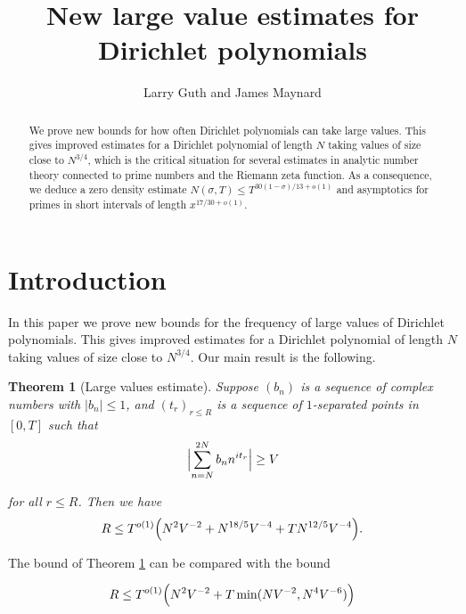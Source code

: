 \documentclass{amsart}
\title{New large value estimates for Dirichlet polynomials}
\author{Larry Guth and James Maynard}
\theoremstyle{plain}
\newtheorem{thrm}{Theorem}[section]
\numberwithin{equation}{section}
\begin{document}
\begin{abstract}
We prove new bounds for how often Dirichlet polynomials can take large values. This gives improved estimates for a Dirichlet polynomial of length $N$ taking values of size close to $N^{3/4}$, which is the critical situation for several estimates in analytic number theory connected to prime numbers and the Riemann zeta function. As a consequence, we deduce a zero density estimate $N(\sigma,T)\le T^{30(1-\sigma)/13+o(1)}$ and asymptotics for primes in short intervals of length $x^{17/30+o(1)}$.
\end{abstract}
\maketitle

%
%
%
%


\section{Introduction}

In this paper we prove new bounds for the frequency of large values of Dirichlet polynomials. This gives improved estimates for a Dirichlet polynomial of length $N$ taking values of size close to $N^{3/4}$.  Our main result is the following.

%
%

\begin{thrm}[Large values estimate]\label{thrm:LargeValues}
Suppose $(b_n)$ is a sequence of complex numbers with $|b_n| \le 1$,  and $(t_r)_{r\le R}$ is a sequence of $1$-separated points in $[0,T]$ such that
\[
\Bigl|\sum_{n= N}^{2N}b_n n^{it_r}\Bigr|\ge V
\]

for all $r\le R$. Then we have
\[
R\le T^{o(1)}\Bigl(N^2V^{-2}+N^{18/5}V^{-4}+TN^{12/5}V^{-4}\Bigr).
\]

\end{thrm}

%
%

The bound of Theorem \ref{thrm:LargeValues} can be compared with the bound

\begin{equation}
R\le T^{o(1)}\Bigl(N^2V^{-2}+T\min(NV^{-2},N^4 V^{-6})\Bigr)
\label{eq:ClassicalLargeValue}
\end{equation}
\end{document}
